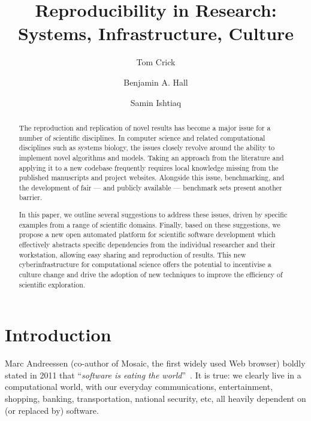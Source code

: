 \documentclass[a4paper,11pt]{article}
\title{Reproducibility in Research: Systems, Infrastructure, Culture}
\author[1]{Tom Crick}
\author[2]{Benjamin A. Hall}
\author[3]{Samin Ishtiaq}
\affil[1]{Cardiff Metropolitan University, UK}
\affil[2]{University of Cambridge, UK}
\affil[3]{Microsoft Research Cambridge, UK}
\affil[1]{\protect\url{tcrick@cardiffmet.ac.uk}}
\affil[2]{\protect\url{bh418@mrc-cu.cam.ac.uk}}
\affil[3]{\protect\url{samin.ishtiaq@microsoft.com}}
\date{ }
\begin{document}
\maketitle



\begin{abstract}
The reproduction and replication of novel results has become a major
issue for a number of scientific disciplines. In computer science and
related computational disciplines such as systems biology, the issues
closely revolve around the ability to implement novel algorithms and
models. Taking an approach from the literature and applying it to a
new codebase frequently requires local knowledge missing from the
published manuscripts and project websites. Alongside this issue,
benchmarking, and the development of fair --- and publicly available
--- benchmark sets present another barrier.

In this paper, we outline several suggestions to address these issues,
driven by specific examples from a range of scientific domains.
Finally, based on these suggestions, we propose a new open automated
platform for scientific software development which effectively
abstracts specific dependencies from the individual researcher and
their workstation, allowing easy sharing and reproduction of
results. This new cyberinfrastructure for computational science offers
the potential to incentivise a culture change and drive the adoption
of new techniques to improve the efficiency of scientific exploration.
\end{abstract}

\section{Introduction}

Marc Andreessen (co-author of Mosaic, the first widely used Web
browser) boldly stated in 2011 that ``{\emph{software is eating the
world}}''~\cite{andreessen:2011}. It is true: we clearly live in a
computational world, with our everyday communications, entertainment,
shopping, banking, transportation, national security, etc, all heavily
dependent on (or replaced by) software.
\end{document}
